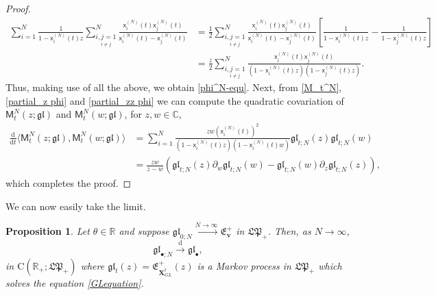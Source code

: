 \documentclass[]{article}
\newtheorem{prop}[thm]{Proposition}
\begin{document}
\begin{proof}
\begin{align*}
\sum_{i=1}^N\frac{1}{1-\mathsf{x}_i^{(N)}(t)z}
    \sum_{\underset{i\neq j}{i,j=1}}^N
    \frac{\mathsf{x}_i^{(N)}(t)\mathsf{x}_j^{(N)}(t)}{\mathsf{x}^{(N)}_i(t)-\mathsf{x}^{(N)}_j(t)}
    &=
    \frac{1}{2}
    \sum_{\underset{i\neq j}{i,j=1}}^N
    \frac{\mathsf{x}_i^{(N)}(t)\mathsf{x}_j^{(N)}(t)}
    {\mathsf{x}^{(N)}_i(t)-\mathsf{x}^{(N)}_j(t)}
    \left[
    \frac{1}{1-\mathsf{x}_i^{(N)}(t)z}
    -
    \frac{1}{1-\mathsf{x}_j^{(N)}(t)z}
    \right]
    \nonumber
    \\
    &=
   \frac{z}{2}
     \sum_{\underset{i\neq j}{i,j=1}}^N\frac{\mathsf{x}_i^{(N)}(t)\mathsf{x}_j^{(N)}(t)}{\left(1-\mathsf{x}_i^{(N)}(t)z\right)\left(1-\mathsf{x}_j^{(N)}(t)z\right)}.
\end{align*}
Thus, making use of all the above, we obtain \eqref{phi^N-equ}.
Next, from 
\eqref{M_t^N},
\eqref{partial_z phi}
and
\eqref{partial_zz phi}
we can compute the quadratic covariation of $\mathsf{M}_t^N(z;\mathfrak{gl})$ and $\mathsf{M}_t^N(w;\mathfrak{gl})$, for $z,w\in \mathbb{C}$,
\begin{align*}
\frac{\mathrm{d}}{\mathrm{d}t}\langle\mathsf{M}_t^N(z;\mathfrak{gl}),
\mathsf{M}_t^N(w;\mathfrak{gl})
\rangle
&=
\sum_{i=1}^N
\frac{zw\left(\mathsf{x}_i^{(N)}(t)\right)^2}{\left(1-\mathsf{x}_i^{(N)}(t)z\right)
\left(1-\mathsf{x}_i^{(N)}(t)w\right)}
\mathfrak{gl}_{t;N}(z)
\mathfrak{gl}_{t;N}(w)
\\
&=
\frac{zw}{z-w}
\left(
\mathfrak{gl}_{t;N}(z)\partial_{w}\mathfrak{gl}_{t;N}(w)
-
\mathfrak{gl}_{t;N}(w)
\partial_z\mathfrak{gl}_{t;N}(z)\right),
\end{align*}
which completes the proof.
\end{proof}


We can now easily take the limit.

\begin{prop}\label{PropEntireEvolGL}
Let $\theta\in \mathbb{R}$ and suppose $\mathfrak{gl}_{0;N} \overset{N \to \infty}{\longrightarrow} \mathfrak{E}_{\boldsymbol{v}}^+$ in $\mathfrak{LP}_+$. Then, as $N\to \infty$,
\begin{equation*}
\mathfrak{gl}_{\bullet;N}\overset{\mathrm{d}}{\longrightarrow} \mathfrak{gl}_\bullet,
\end{equation*}
in $\mathrm{C}(\mathbb{R}_+;\mathfrak{LP}_+)$ where $\mathfrak{gl}_t(z)=\mathfrak{E}_{\mathbf{X}_{GL}^t}^+(z)$ is a Markov process in $\mathfrak{LP}_+$ which solves the equation \eqref{GLequation}.
\end{prop}
\end{document}
